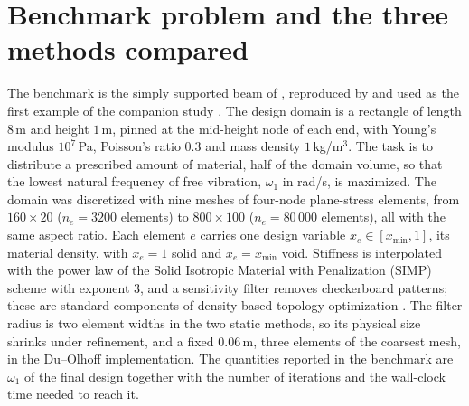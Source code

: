 \documentclass[11pt,a4paper]{article}
\begin{document}
\section{Benchmark problem and the three methods compared}
\label{sec:setting}

The benchmark is the simply supported beam of \citet{Du2007}, reproduced by \citet{Yuksel2025} and used as the first example of the companion study \citep{Tauzowski2026}. The design domain is a rectangle of length $8$\,m and height $1$\,m, pinned at the mid-height node of each end, with Young's modulus $10^{7}$\,Pa, Poisson's ratio $0.3$ and mass density $1$\,kg/m$^3$. The task is to distribute a prescribed amount of material, half of the domain volume, so that the lowest natural frequency of free vibration, $\omega_1$ in rad/s, is maximized. The domain was discretized with nine meshes of four-node plane-stress elements, from $160\times20$ ($n_e = 3200$ elements) to $800\times100$ ($n_e = 80\,000$ elements), all with the same aspect ratio. Each element $e$ carries one design variable $x_e \in [x_{\min}, 1]$, its material density, with $x_e = 1$ solid and $x_e = x_{\min}$ void. Stiffness is interpolated with the power law of the Solid Isotropic Material with Penalization (SIMP) scheme with exponent $3$, and a sensitivity filter removes checkerboard patterns; these are standard components of density-based topology optimization \citep{Andreassen2011}. The filter radius is two element widths in the two static methods, so its physical size shrinks under refinement, and a fixed $0.06$\,m, three elements of the coarsest mesh, in the Du--Olhoff implementation. The quantities reported in the benchmark are $\omega_1$ of the final design together with the number of iterations and the wall-clock time needed to reach it.
\end{document}
